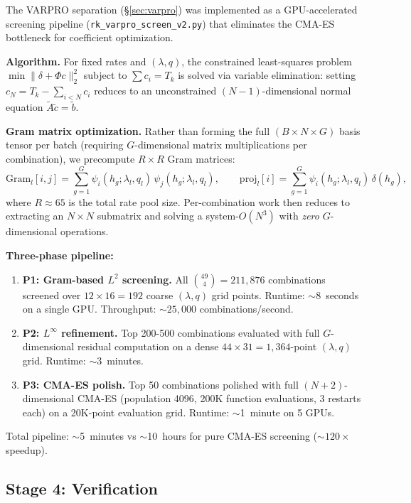 \documentclass[12pt]{article}
\begin{document}
The VARPRO separation (\S\ref{sec:varpro}) was implemented as a GPU-accelerated screening pipeline (\texttt{rk\_varpro\_screen\_v2.py}) that eliminates the CMA-ES bottleneck for coefficient optimization.

\medskip\noindent\textbf{Algorithm.} For fixed rates and $(\lambda,q)$, the constrained least-squares problem $\min \|\delta + \Phi c\|_2^2$ subject to $\sum c_i = T_k$ is solved via variable elimination: setting $c_N = T_k - \sum_{i<N} c_i$ reduces to an unconstrained $(N{-}1)$-dimensional normal equation $\tilde{A}\tilde{c} = \tilde{b}$.

\medskip\noindent\textbf{Gram matrix optimization.} Rather than forming the full $(B \times N \times G)$ basis tensor per batch (requiring $G$-dimensional matrix multiplications per combination), we precompute $R \times R$ Gram matrices:
\[
\text{Gram}_{l}[i,j] = \sum_{g=1}^{G} \psi_i(h_g;\lambda_l,q_l)\,\psi_j(h_g;\lambda_l,q_l),
\qquad
\text{proj}_l[i] = \sum_{g=1}^{G} \psi_i(h_g;\lambda_l,q_l)\,\delta(h_g),
\]
where $R \approx 65$ is the total rate pool size. Per-combination work then reduces to extracting an $N \times N$ submatrix and solving a system-$O(N^3)$ with \emph{zero} $G$-dimensional operations.

\medskip\noindent\textbf{Three-phase pipeline:}
\begin{enumerate}
\item \textbf{P1: Gram-based $L^2$ screening.} All $\binom{49}{4} = 211{,}876$ combinations screened over $12 \times 16 = 192$ coarse $(\lambda,q)$ grid points. Runtime: $\sim$8~seconds on a single GPU. Throughput: ${\sim}25{,}000$ combinations/second.
\item \textbf{P2: $L^\infty$ refinement.} Top 200-500 combinations evaluated with full $G$-dimensional residual computation on a dense $44 \times 31 = 1{,}364$-point $(\lambda,q)$ grid. Runtime: $\sim$3~minutes.
\item \textbf{P3: CMA-ES polish.} Top 50 combinations polished with full $(N{+}2)$-dimensional CMA-ES (population 4096, 200K function evaluations, 3 restarts each) on a 20K-point evaluation grid. Runtime: $\sim$1~minute on 5 GPUs.
\end{enumerate}

\noindent Total pipeline: $\sim$5~minutes vs $\sim$10~hours for pure CMA-ES screening (${\sim}120\times$ speedup).

\subsection{Stage 4: Verification}
\end{document}
